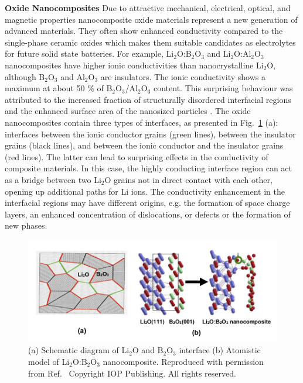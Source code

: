 \documentclass[../main.tex]{subfiles}
\begin{document}
\textbf{Oxide Nanocomposites} Due to attractive mechanical, electrical, optical, and magnetic properties nanocomposite oxide materials represent a new generation of advanced materials. \cite{uvarov2011,Heitjans_2003} They often show enhanced conductivity compared to the single-phase ceramic oxides which makes them suitable candidates as electrolytes for future solid state batteries. For example, Li$_2$O:B$_2$O$_3$ \cite{Heitjans_2003,Indris2000,Indris2002} and Li$_2$O:Al$_2$O$_3$ nanocomposites \cite{B300908D} have higher ionic conductivities than nanocrystalline Li$_2$O, although B$_2$O$_3$ and Al$_2$O$_3$ are insulators. The ionic conductivity shows a maximum at about 50 \% of B$_2$O$_3$/Al$_2$O$_3$ content. This surprising behaviour was attributed to the increased fraction of structurally disordered interfacial regions and the enhanced surface area of the nanosized particles \cite{Heitjans_2003}. The oxide nanocomposites contain three types of interfaces, as presented in Fig.~\ref{fig:LBO} (a): interfaces between the ionic conductor grains (green lines), between the insulator grains (black lines), and between the ionic conductor and the insulator grains (red lines). The latter can lead to surprising effects in the conductivity of composite materials. In this case, the highly conducting interface region can act as a bridge between two Li$_2$O grains not in direct contact with each other, opening up additional paths for Li ions. The conductivity enhancement in the interfacial regions may have different origins, e.g. the formation of space charge layers, an enhanced concentration of dislocations, or defects or the formation of new phases.

\begin{figure}
    \centering
    \includegraphics[scale=1]{figures/Islam-Fig-Li2O-B2O3.png}
    \caption{(a) Schematic diagram of Li$_2$O and B$_2$O$_3$ interface (b) Atomistic model of Li$_2$O:B$_2$O$_3$ nanocomposite. Reproduced with permission from Ref.~ Copyright IOP Publishing. All rights reserved.}
    \label{fig:LBO}
\end{figure}
\end{document}
